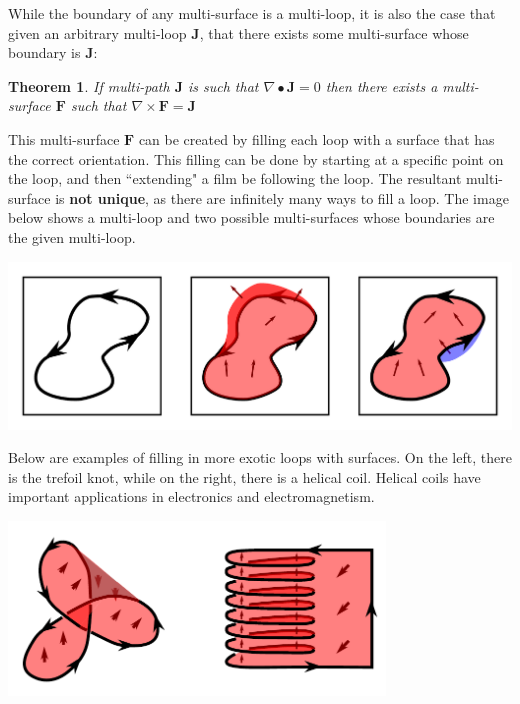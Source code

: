 \documentclass{book}
\newtheorem{thm}{Theorem}
\begin{document}
While the boundary of any multi-surface is a multi-loop, it is also the case that given an arbitrary multi-loop \(\mathbf{J}\), that there exists some multi-surface whose boundary is \(\mathbf{J}\):

\begin{thm}
If multi-path \(\mathbf{J}\) is such that \(\nabla \bullet \mathbf{J} = 0\) then there exists a multi-surface \(\mathbf{F}\) such that \(\nabla \times \mathbf{F} = \mathbf{J}\)
\end{thm}

This multi-surface \(\mathbf{F}\) can be created by filling each loop with a surface that has the correct orientation. This filling can be done by starting at a specific point on the loop, and then ``extending" a film be following the loop. The resultant multi-surface is {\bf not unique}, as there are infinitely many ways to fill a loop. The image below shows a multi-loop and two possible multi-surfaces whose boundaries are the given multi-loop. 

\begin{center}
\includegraphics[width = \textwidth]{Boundaries/Surface_boundaries/surface_filling}
\end{center}

Below are examples of filling in more exotic loops with surfaces. On the left, there is the trefoil knot, while on the right, there is a helical coil. Helical coils have important applications in electronics and electromagnetism. 

\begin{center}
\includegraphics[width = 0.75\textwidth]{Boundaries/Surface_boundaries/exotic_surface_filling_examples}
\end{center}
\end{document}
